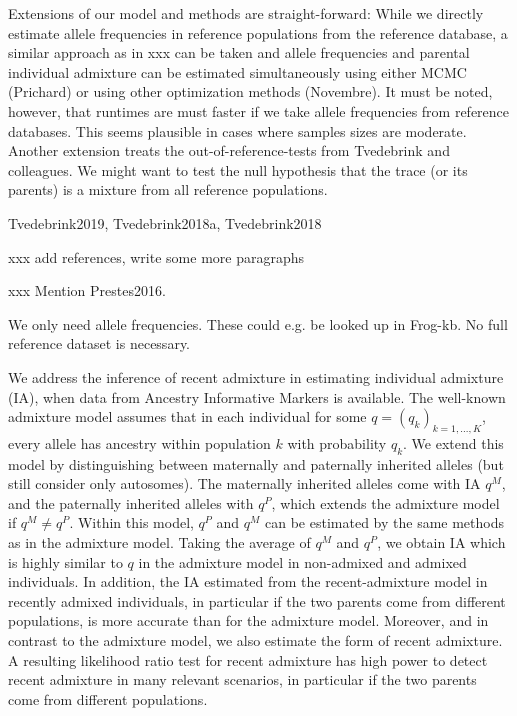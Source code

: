 \documentclass[12pt]{article}
\theoremstyle{definition}
\begin{document}
Extensions of our model and methods are straight-forward: While we
directly estimate allele frequencies in reference populations from the
reference database, a similar approach as in xxx can be taken and
allele frequencies and parental individual admixture can be estimated
simultaneously using either MCMC (Prichard) or using other
optimization methods (Novembre). It must be noted, however, that
runtimes are must faster if we take allele frequencies from reference
databases. This seems plausible in cases where samples sizes are
moderate. Another extension treats the out-of-reference-tests from
Tvedebrink and colleagues. We might want to test the null hypothesis
that the trace (or its parents) is a mixture from all reference
populations.

\nocite{article}{Tvedebrink2019, Tvedebrink2018a, Tvedebrink2018}


xxx add references, write some more paragraphs

xxx Mention \cite{article}{Prestes2016}.

We only need allele frequencies. These could e.g. be looked up in
Frog-kb. No full reference dataset is necessary.






We address the inference of recent admixture in estimating individual
admixture (IA), when data from Ancestry Informative Markers is
available. The well-known admixture model assumes that in each
individual for some $q = (q_k)_{k=1,...,K}$, every allele has ancestry
within population $k$ with probability $q_k$. We extend this model by
distinguishing between maternally and paternally inherited alleles
(but still consider only autosomes). The maternally inherited alleles
come with IA $q^M$, and the paternally inherited alleles with $q^P$,
which extends the admixture model if $q^M \neq q^P$. Within this
model, $q^P$ and $q^M$ can be estimated by the same methods as in the
admixture model. Taking the average of $q^M$ and $q^P$, we obtain IA
which is highly similar to $q$ in the admixture model in non-admixed
and admixed individuals. In addition, the IA estimated from the
recent-admixture model in recently admixed individuals, in particular
if the two parents come from different populations, is more accurate
than for the admixture model. Moreover, and in contrast to the
admixture model, we also estimate the form of recent admixture. A
resulting likelihood ratio test for recent admixture has high power to
detect recent admixture in many relevant scenarios, in particular if
the two parents come from different populations.
\end{document}
